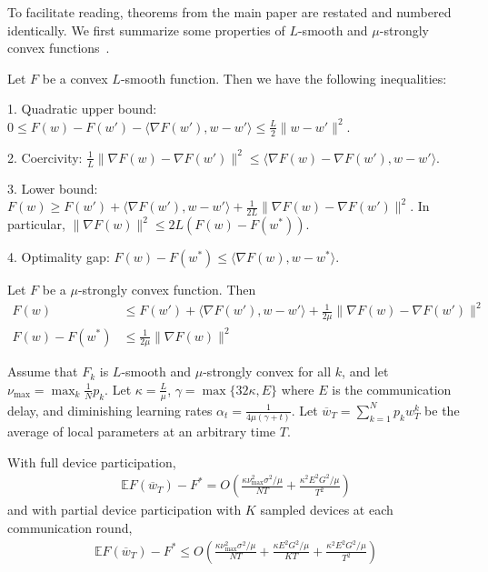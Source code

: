 To facilitate reading, theorems from the main paper are restated and numbered identically. We first summarize some properties of $L$-smooth and $\mu$-strongly
convex functions~\cite{rockafellar1970convex}. 
\begin{lemma}
	Let $F$ be a convex $L$-smooth function. Then we have the following
	inequalities:
	
	1. Quadratic upper bound: $0\leq F(w)-F(w')-\langle\nabla F(w'),w-w'\rangle\leq\frac{L}{2}\|w-w'\|^{2}$. 
	
	2. Coercivity: $\frac{1}{L}\|\nabla F(w)-\nabla F(w')\|^{2}\leq\langle\nabla F(w)-\nabla F(w'),w-w'\rangle$.
	
	3. Lower bound: $F(w)\geq F(w')+\langle\nabla F(w'),w-w'\rangle+\frac{1}{2L}\|\nabla F(w)-\nabla F(w')\|^{2}$.
	In particular, $\|\nabla F(w)\|^{2}\leq2L(F(w)-F(w^{\ast}))$.
	
	4. Optimality gap: $F(w)-F(w^{\ast})\leq$$\langle\nabla F(w),w-w^{\ast}\rangle$.
\end{lemma}
%
\begin{lemma}
	Let $F$ be a $\mu$-strongly convex function. Then 
	\begin{align*}
	F(w) & \leq F(w')+\langle\nabla F(w'),w-w'\rangle+\frac{1}{2\mu}\|\nabla F(w)-\nabla F(w')\|^{2}\\
	F(w)-F(w^{\ast}) & \leq\frac{1}{2\mu}\|\nabla F(w)\|^{2}
	\end{align*}
\end{lemma}

\begin{thm}
	Assume that $F_{k}$ is $L$-smooth and $\mu$-strongly convex for
	all $k$, and let $\nu_{\max}=\max_{k}\frac{1}{N}p_{k}$. Let $\kappa=\frac{L}{\mu}$,
	$\gamma=\max\{32\kappa,E\}$ where $E$ is the communication delay,
	and diminishing learning rates $\alpha_{t}=\frac{1}{4\mu(\gamma+t)}$.
	Let $\overline{w}_{T}=\sum_{k=1}^{N}p_{k}w_{T}^{k}$ be the average
	of local parameters at an arbitrary time $T$. 
	
	With full device participation, 
	\begin{align*}
	\mathbb{E}F(\overline{w}_{T})-F^{\ast}=O(\frac{\kappa\nu_{\max}^{2}\sigma^{2}/\mu}{NT}+\frac{\kappa^{2}E^{2}G^{2}/\mu}{T^{2}})
	\end{align*}
	and with partial device participation with $K$ sampled devices at
	each communication round, 
	\begin{align*}
	\mathbb{E}F(\overline{w}_{T})-F^{\ast}\leq O(\frac{\kappa\nu_{\max}^{2}\sigma^{2}/\mu}{NT}+\frac{\kappa E^{2}G^{2}/\mu}{KT}+\frac{\kappa^{2}E^{2}G^{2}/\mu}{T^{2}})
	\end{align*}
\end{thm}

